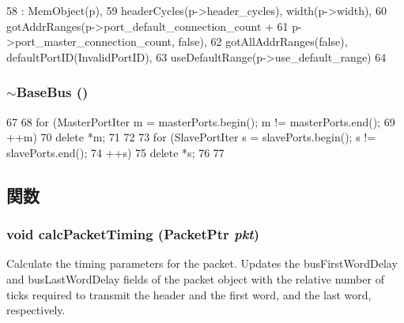\begin{DoxyCode}
58     : MemObject(p),
59       headerCycles(p->header_cycles), width(p->width),
60       gotAddrRanges(p->port_default_connection_count +
61                           p->port_master_connection_count, false),
62       gotAllAddrRanges(false), defaultPortID(InvalidPortID),
63       useDefaultRange(p->use_default_range)
64 {}
\end{DoxyCode}
\hypertarget{classBaseBus_a4c37180f5639002a5c75b2c1ec3c3ab4}{
\subsubsection[{$\sim$BaseBus}]{\setlength{\rightskip}{0pt plus 5cm}$\sim${\bf BaseBus} ()}}
\label{classBaseBus_a4c37180f5639002a5c75b2c1ec3c3ab4}



\begin{DoxyCode}
67 {
68     for (MasterPortIter m = masterPorts.begin(); m != masterPorts.end();
69          ++m) {
70         delete *m;
71     }
72 
73     for (SlavePortIter s = slavePorts.begin(); s != slavePorts.end();
74          ++s) {
75         delete *s;
76     }
77 }
\end{DoxyCode}


\subsection{関数}
\hypertarget{classBaseBus_a0e69bf0fe1b87ac59689c3807a942ee7}{
\subsubsection[{calcPacketTiming}]{\setlength{\rightskip}{0pt plus 5cm}void calcPacketTiming ({\bf PacketPtr} {\em pkt})}}
\label{classBaseBus_a0e69bf0fe1b87ac59689c3807a942ee7}
Calculate the timing parameters for the packet. Updates the busFirstWordDelay and busLastWordDelay fields of the packet object with the relative number of ticks required to transmit the header and the first word, and the last word, respectively. 



